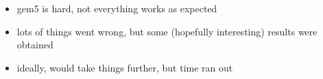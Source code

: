 \begin{itemize}
    \item gem5 is hard, not everything works as expected
    \item lots of things went wrong, but some (hopefully interesting) results 
          were obtained
    \item ideally, would take things further, but time ran out
\end{itemize}
